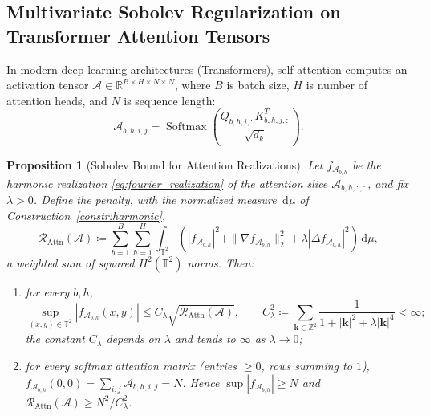\documentclass[11pt,a4paper,reqno]{amsart}
\newtheorem{proposition}[theorem]{Proposition}
\theoremstyle{definition}
\numberwithin{equation}{section}
\newcommand{\R}{\mathbb{R}}
\newcommand{\Z}{\mathbb{Z}}
\newcommand{\Tor}{\mathbb{T}}
\newcommand{\dif}{\,\mathrm{d}}
\begin{document}
\subsection{Multivariate Sobolev Regularization on Transformer Attention Tensors}
\label{subsec:transformer_tensors}

In modern deep learning architectures (Transformers), self-attention computes an activation tensor $\mathcal{A} \in \R^{B \times H \times N \times N}$, where $B$ is batch size, $H$ is number of attention heads, and $N$ is sequence length:
\begin{equation}
    \mathcal{A}_{b, h, i, j} = \operatorname{Softmax}\left( \frac{Q_{b, h, i, :} K_{b, h, j, :}^T}{\sqrt{d_k}} \right).
\end{equation}

\begin{proposition}[Sobolev Bound for Attention Realizations]
\label{thm:attention_sobolev}
Let $f_{\mathcal{A}_{b,h}}$ be the harmonic realization \eqref{eq:fourier_realization} of the attention slice $\mathcal{A}_{b, h, :, :}$, and fix $\lambda > 0$. Define the penalty, with the normalized measure $\dif\mu$ of Construction~\ref{constr:harmonic},
\begin{equation}
    \mathcal{R}_{\mathrm{Attn}}(\mathcal{A}) \coloneqq \sum_{b=1}^B \sum_{h=1}^H \int_{\Tor^2} \left( |f_{\mathcal{A}_{b,h}}|^2 + \|\nabla f_{\mathcal{A}_{b,h}}\|_2^2 + \lambda |\Delta f_{\mathcal{A}_{b,h}}|^2 \right) \dif \mu,
\end{equation}
a weighted sum of squared $H^2(\Tor^2)$ norms. Then:
\begin{enumerate}[label=(\roman*)]
    \item for every $b, h$,
    \begin{equation}
        \label{eq:attention_sup_bound}
        \sup_{(x, y) \in \Tor^2} |f_{\mathcal{A}_{b,h}}(x, y)| \le C_\lambda \sqrt{\mathcal{R}_{\mathrm{Attn}}(\mathcal{A})}, \qquad C_\lambda^2 \coloneqq \sum_{\mathbf{k} \in \Z^2} \frac{1}{1 + |\mathbf{k}|^2 + \lambda |\mathbf{k}|^4} < \infty;
    \end{equation}
    the constant $C_\lambda$ depends on $\lambda$ and tends to $\infty$ as $\lambda \to 0$;
    \item for every softmax attention matrix (entries $\ge 0$, rows summing to $1$), $f_{\mathcal{A}_{b,h}}(0,0) = \sum_{i,j} \mathcal{A}_{b,h,i,j} = N$. Hence $\sup |f_{\mathcal{A}_{b,h}}| \ge N$ and $\mathcal{R}_{\mathrm{Attn}}(\mathcal{A}) \ge N^2 / C_\lambda^2$.
\end{enumerate}
\end{proposition}
\end{document}
